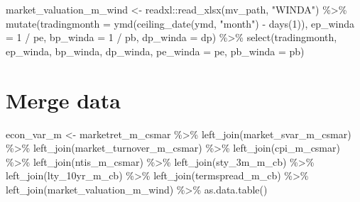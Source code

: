 \documentclass[
]{article}
\newenvironment{Shaded}{\begin{snugshade}}{\end{snugshade}}
\newcommand{\AttributeTok}[1]{\textcolor[rgb]{0.77,0.63,0.00}{#1}}
\newcommand{\DecValTok}[1]{\textcolor[rgb]{0.00,0.00,0.81}{#1}}
\newcommand{\FunctionTok}[1]{\textcolor[rgb]{0.00,0.00,0.00}{#1}}
\newcommand{\NormalTok}[1]{#1}
\newcommand{\OtherTok}[1]{\textcolor[rgb]{0.56,0.35,0.01}{#1}}
\newcommand{\SpecialCharTok}[1]{\textcolor[rgb]{0.00,0.00,0.00}{#1}}
\newcommand{\StringTok}[1]{\textcolor[rgb]{0.31,0.60,0.02}{#1}}
\begin{document}
\begin{Shaded}
\begin{Highlighting}[]
\NormalTok{market\_valuation\_m\_wind }\OtherTok{\textless{}{-}}\NormalTok{ readxl}\SpecialCharTok{::}\FunctionTok{read\_xlsx}\NormalTok{(mv\_path, }\StringTok{"WINDA"}\NormalTok{) }\SpecialCharTok{\%\textgreater{}\%} 
      \FunctionTok{mutate}\NormalTok{(}\AttributeTok{tradingmonth =} \FunctionTok{ymd}\NormalTok{(}\FunctionTok{ceiling\_date}\NormalTok{(ymd, }\StringTok{"month"}\NormalTok{) }\SpecialCharTok{{-}} \FunctionTok{days}\NormalTok{(}\DecValTok{1}\NormalTok{)), }\AttributeTok{ep\_winda =} \DecValTok{1} \SpecialCharTok{/}\NormalTok{ pe, }\AttributeTok{bp\_winda =} \DecValTok{1} \SpecialCharTok{/}\NormalTok{ pb, }\AttributeTok{dp\_winda =}\NormalTok{ dp) }\SpecialCharTok{\%\textgreater{}\%} 
      \FunctionTok{select}\NormalTok{(tradingmonth, ep\_winda, bp\_winda, dp\_winda, }\AttributeTok{pe\_winda =}\NormalTok{ pe, }\AttributeTok{pb\_winda =}\NormalTok{ pb) }
\end{Highlighting}
\end{Shaded}

\hypertarget{merge-data}{%
\section{Merge data}\label{merge-data}}

\begin{Shaded}
\begin{Highlighting}[]
\NormalTok{econ\_var\_m }\OtherTok{\textless{}{-}}\NormalTok{ marketret\_m\_csmar }\SpecialCharTok{\%\textgreater{}\%} 
  \FunctionTok{left\_join}\NormalTok{(market\_svar\_m\_csmar) }\SpecialCharTok{\%\textgreater{}\%} 
  \FunctionTok{left\_join}\NormalTok{(market\_turnover\_m\_csmar) }\SpecialCharTok{\%\textgreater{}\%} 
  \FunctionTok{left\_join}\NormalTok{(cpi\_m\_csmar) }\SpecialCharTok{\%\textgreater{}\%} 
  \FunctionTok{left\_join}\NormalTok{(ntis\_m\_csmar) }\SpecialCharTok{\%\textgreater{}\%} 
  \FunctionTok{left\_join}\NormalTok{(sty\_3m\_m\_cb) }\SpecialCharTok{\%\textgreater{}\%} 
  \FunctionTok{left\_join}\NormalTok{(lty\_10yr\_m\_cb) }\SpecialCharTok{\%\textgreater{}\%} 
  \FunctionTok{left\_join}\NormalTok{(termspread\_m\_cb) }\SpecialCharTok{\%\textgreater{}\%} 
  \FunctionTok{left\_join}\NormalTok{(market\_valuation\_m\_wind) }\SpecialCharTok{\%\textgreater{}\%} 
  \FunctionTok{as.data.table}\NormalTok{()}
\end{Highlighting}
\end{Shaded}


  
\end{document}
